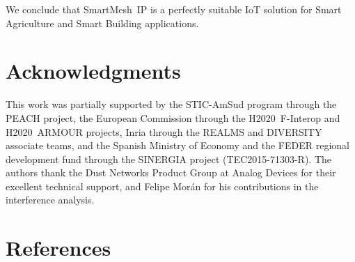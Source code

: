 \documentclass{elsarticle}
\newcommand{\smip}                {SmartMesh~IP\xspace}
\newcommand{\building}            {Smart Building\xspace}
\newcommand{\agri}                {Smart Agriculture\xspace}
\begin{document}

We conclude that \smip is a perfectly suitable IoT solution for \agri and \building applications.

\section*{Acknowledgments}

This work was partially supported by
the STIC-AmSud program through the PEACH project,
the European Commission through the H2020~F-Interop and H2020~ARMOUR projects,
Inria through the REALMS and DIVERSITY associate teams, and
the Spanish Ministry of Economy and the FEDER regional development fund through the SINERGIA project (TEC2015-71303-R).
The authors thank
the Dust Networks Product Group at Analog Devices for their excellent technical support, and
Felipe Mor{\'{a}}n for his contributions in the interference analysis.

\section*{References}


\end{document}
